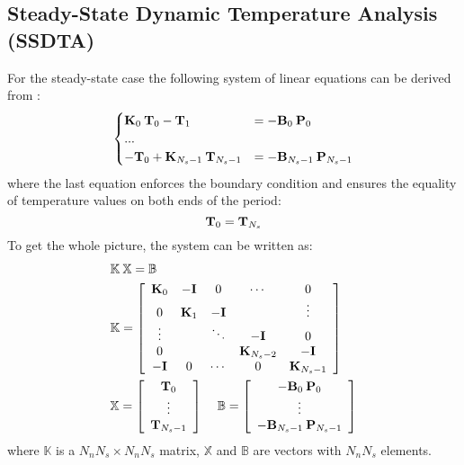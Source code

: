 \subsection{Steady-State Dynamic Temperature Analysis (SSDTA)}
For the steady-state case the following system of linear equations can be derived from :
\[
  \begin{cases}
    \mathbf{K}_0 \: \mathbf{T}_0 - \mathbf{T}_1 & = -\mathbf{B}_0 \: \mathbf{P}_0 \\
    ... \\
    -\mathbf{T}_0 + \mathbf{K}_{N_s - 1} \: \mathbf{T}_{N_s - 1} & = -\mathbf{B}_{N_s - 1} \: \mathbf{P}_{N_s - 1}
  \end{cases}
\]
where the last equation enforces the boundary condition and ensures the equality of temperature values on both ends of the period:
\begin{equation} \label{eq:boundary-condition}
  \mathbf{T}_0 = \mathbf{T}_{N_s}
\end{equation}
To get the whole picture, the system can be written as:
\begin{align}
  & \mathbb{K} \: \mathbb{X} = \mathbb{B} \label{eq:system} \\
  & \mathbb{K} = \left[
    \begin{array}{ccccc}
      \mathbf{K}_0 & -\mathbf{I} & 0 & \cdots & 0 \\
      0 & \mathbf{K}_1 & -\mathbf{I} &  & \vdots \\
      \vdots &  & \ddots & -\mathbf{I} & 0 \\
      0 &  &  & \mathbf{K}_{N_s - 2} & -\mathbf{I} \\
      -\mathbf{I} & 0 & \cdots & 0 & \mathbf{K}_{N_s - 1}
    \end{array}
  \right] \nonumber \\
  & \mathbb{X} = \left[
    \begin{array}{c}
      \mathbf{T}_0 \\
      \vdots \\
      \mathbf{T}_{N_s - 1}
    \end{array}
  \right] \; \; \; \; \mathbb{B} = \left[
    \begin{array}{c}
      -\mathbf{B}_0 \: \mathbf{P}_0 \\
      \vdots \\
      -\mathbf{B}_{N_s - 1} \: \mathbf{P}_{N_s - 1}
    \end{array}
  \right] \nonumber
\end{align}
where $\mathbb{K}$ is a $N_n N_s \times N_n N_s$ matrix, $\mathbb{X}$ and $\mathbb{B}$ are vectors with $N_n N_s$ elements.


